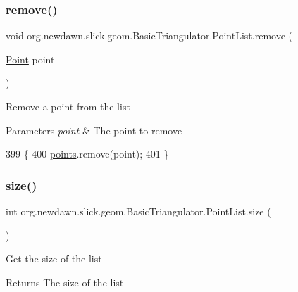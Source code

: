 \subsubsection{\texorpdfstring{remove()}{remove()}}
{\footnotesize\ttfamily void org.\+newdawn.\+slick.\+geom.\+Basic\+Triangulator.\+Point\+List.\+remove (\begin{DoxyParamCaption}\item[{\mbox{\hyperlink{classorg_1_1newdawn_1_1slick_1_1geom_1_1_basic_triangulator_1_1_point}{Point}}}]{point }\end{DoxyParamCaption})\hspace{0.3cm}{\ttfamily [inline]}}

Remove a point from the list


\begin{DoxyParams}{Parameters}
{\em point} & The point to remove \\
\hline
\end{DoxyParams}

\begin{DoxyCode}
399                                         \{
400             \mbox{\hyperlink{classorg_1_1newdawn_1_1slick_1_1geom_1_1_basic_triangulator_1_1_point_list_afc89fd9387b7c0663eda4f928e610b8a}{points}}.remove(point);
401         \}
\end{DoxyCode}
\mbox{\label{classorg_1_1newdawn_1_1slick_1_1geom_1_1_basic_triangulator_1_1_point_list_acc38c8b7107150c8fd3231250711cc6b}} 
\subsubsection{\texorpdfstring{size()}{size()}}
{\footnotesize\ttfamily int org.\+newdawn.\+slick.\+geom.\+Basic\+Triangulator.\+Point\+List.\+size (\begin{DoxyParamCaption}{ }\end{DoxyParamCaption})\hspace{0.3cm}{\ttfamily [inline]}}

Get the size of the list

\begin{DoxyReturn}{Returns}
The size of the list 
\end{DoxyReturn}

